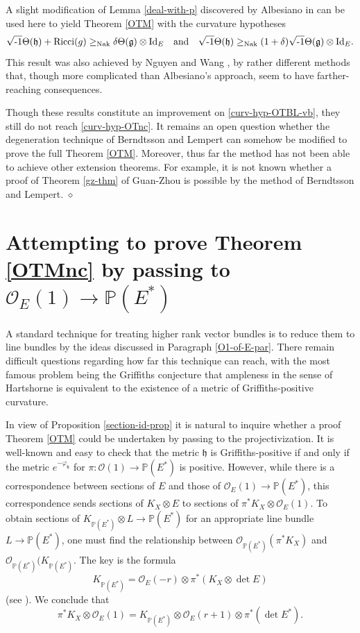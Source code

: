 \documentclass[12pt,hidelinks]{amsart}
\newcommand{\cO}{{\mathcal O}}
\newcommand{\fg}{{\mathfrak g}}
\newcommand{\fh}{{\mathfrak h}}
\newcommand{\vp}{\varphi}
\newcommand{\bbP}{{\mathbb P}}
\newcommand{\red}{\hfill $\diamond$}
\newcommand{\ii}{\sqrt{\text{\rm -}1}}
\newcommand{\tensor}{\otimes}
\begin{document}
\begin{rmk}
A slight modification of Lemma \ref{deal-with-p} discovered by Albesiano in \cite{roberto} can be used here to yield Theorem \ref{OTM} with the curvature hypotheses 
\begin{equation}
\ii \Theta (\fh) +{\rm Ricci}(g) \ge_{\rm Nak} \delta \Theta (\fg) \tensor {\rm Id}_{E} \quad\text{and} \quad \ii \Theta (\fh) \ge_{\rm Nak} (1+\delta) \ii \Theta (\fg) \tensor {\rm Id}_{E}.
\end{equation}
This result was also achieved by Nguyen and Wang \cite{nw}, by rather different methods that, though more complicated than Albesiano's approach, seem to have farther-reaching consequences.

Though these results constitute an improvement on \eqref{curv-hyp-OTBL-vb}, they still do not reach \eqref{curv-hyp-OTnc}.  It remains an open question whether the degeneration technique of Berndtsson and Lempert can somehow be modified to prove the full Theorem \ref{OTM}.  Moreover, thus far the method has not been able to achieve other extension theorems.  For example, it is not known whether a proof of Theorem \ref{gz-thm} of Guan-Zhou is possible by the method of Berndtsson and Lempert.
\red
\end{rmk}



\section{Attempting to prove Theorem \ref{OTMnc} by passing to $\cO _E(1) \to \bbP(E^*)$}\label{OT-Grif-pf-section}

A standard technique for treating higher rank vector bundles is to reduce them to line bundles by the ideas discussed in Paragraph \ref{O1-of-E-par}.  There remain difficult questions regarding how far this technique can reach, with the most famous problem being the Griffiths conjecture that ampleness in the sense of Hartshorne is equivalent to the existence of a metric of Griffiths-positive curvature.  

In view of Proposition \ref{section-id-prop} it is natural to inquire whether a proof Theorem \ref{OTM} could be undertaken by passing to the projectivization.  It is well-known and easy to check that the metric $\fh$ is Griffiths-positive if and only if the metric $e^{-\vp_{\fh}}$ for $\pi : \cO (1) \to \bbP(E^*)$ is positive.  However, while there is a correspondence between sections of $E$ and those of $\cO _E(1) \to \bbP(E^*)$, this correspondence sends sections of $K_X \tensor E$ to sections of $\pi ^* K_X \tensor \cO _E(1)$.  To obtain sections of $K_{\bbP(E^*)} \tensor L \to \bbP(E^*)$ for an appropriate line bundle $L \to \bbP(E^*)$, one must find the relationship between $\cO_{\bbP(E^*)} (\pi ^* K_X)$ and $\cO_{\bbP(E^*)}(K_{\bbP(E^*)}$.  The key is the formula 
\[
K_{\bbP(E^*)}= \cO_E (-r) \tensor \pi ^* (K_X \tensor \det E)
\]
(see \cite[Proposition 3.6.20]{kob}).  We conclude that 
\[
\pi ^* K_X \tensor \cO _E(1) = K_{\bbP(E^*)} \tensor \cO _E(r+1) \tensor \pi ^*(\det E^*).
\]
\end{document}
